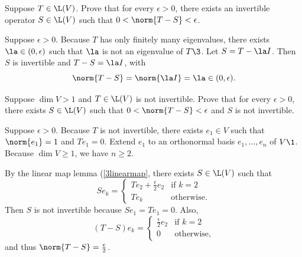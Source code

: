 \exercise
Suppose $T \in \L(V)$. Prove that for every $\epsilon > 0$, there exists an invertible operator $S \in \L(V)$ such that $0 < \norm{T - S} < \epsilon$. \label{7invert}

\begin{Solution}
Suppose $\epsilon > 0$. Because $T$ has only finitely many eigenvalues, there exists $\la \in (0, \epsilon)$ such that $\la$ is not an eigenvalue of $T\3$. Let
$S = T - \la I$. Then $S$ is invertible and $T - S = \la I$, with
\[
\norm{T - S} = \norm{\la I} = \la \in (0, \epsilon).
\]
\end{Solution}

\exercise
Suppose $\dim V > 1$ and $T \in \L(V)$ is not invertible. Prove that for every $\epsilon > 0$, there exists
$S \in \L(V)$ such that $0 < \norm{T - S} < \epsilon$ and $S$ is not invertible.

\begin{Solution}
Suppose $\epsilon > 0$. Because $T$ is not invertible, there exists $e_1 \in V$ such that $\norm{e_1} = 1$ and $Te_1 = 0$. Extend $e_1$ to an orthonormal basis $e_1, \ldots, e_n$ of $V\1$. Because $\dim V \ge 1$, we have $n \ge 2$.

By the linear map lemma (\ref{3linearmap}, there exists $S \in \L(V)$ such that
\[
Se_k = \begin{cases}
Te_2 + \frac{\epsilon}{2}e_2 & \text{if } k = 2 \\[3bp]
Te_k & \text{otherwise}.
\end{cases}
\]
Then $S$ is not invertible because $Se_1 = Te_1 = 0$. Also,
\[
(T-S)e_k = \begin{cases}
\frac{\epsilon}{2}e_2 & \text{if } k = 2 \\[3bp]
0 & \text{otherwise},
\end{cases}
\]
and thus $\norm{T-S} = \frac{\epsilon}{2}$.
\end{Solution}

